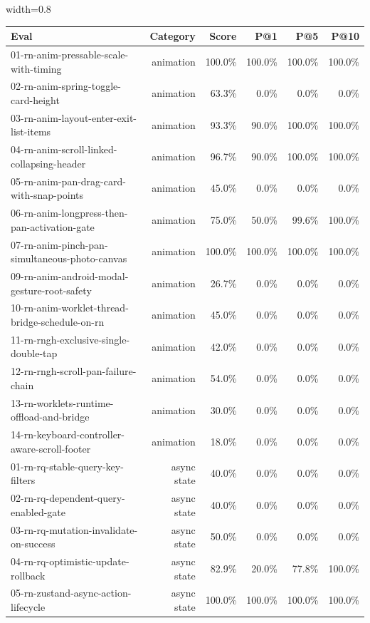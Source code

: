 \begin{table}[htbp]
\centering
\begin{adjustbox}{width=0.8\textwidth}
\begin{tabular}{lrrrrr}
\toprule
Eval & Category & Score & P@1 & P@5 & P@10 \\
\midrule
01-rn-anim-pressable-scale-with-timing & animation & 100.0\% & 100.0\% & 100.0\% & 100.0\% \\
02-rn-anim-spring-toggle-card-height & animation & 63.3\% & 0.0\% & 0.0\% & 0.0\% \\
03-rn-anim-layout-enter-exit-list-items & animation & 93.3\% & 90.0\% & 100.0\% & 100.0\% \\
04-rn-anim-scroll-linked-collapsing-header & animation & 96.7\% & 90.0\% & 100.0\% & 100.0\% \\
05-rn-anim-pan-drag-card-with-snap-points & animation & 45.0\% & 0.0\% & 0.0\% & 0.0\% \\
06-rn-anim-longpress-then-pan-activation-gate & animation & 75.0\% & 50.0\% & 99.6\% & 100.0\% \\
07-rn-anim-pinch-pan-simultaneous-photo-canvas & animation & 100.0\% & 100.0\% & 100.0\% & 100.0\% \\
09-rn-anim-android-modal-gesture-root-safety & animation & 26.7\% & 0.0\% & 0.0\% & 0.0\% \\
10-rn-anim-worklet-thread-bridge-schedule-on-rn & animation & 45.0\% & 0.0\% & 0.0\% & 0.0\% \\
11-rn-rngh-exclusive-single-double-tap & animation & 42.0\% & 0.0\% & 0.0\% & 0.0\% \\
12-rn-rngh-scroll-pan-failure-chain & animation & 54.0\% & 0.0\% & 0.0\% & 0.0\% \\
13-rn-worklets-runtime-offload-and-bridge & animation & 30.0\% & 0.0\% & 0.0\% & 0.0\% \\
14-rn-keyboard-controller-aware-scroll-footer & animation & 18.0\% & 0.0\% & 0.0\% & 0.0\% \\
01-rn-rq-stable-query-key-filters & async state & 40.0\% & 0.0\% & 0.0\% & 0.0\% \\
02-rn-rq-dependent-query-enabled-gate & async state & 40.0\% & 0.0\% & 0.0\% & 0.0\% \\
03-rn-rq-mutation-invalidate-on-success & async state & 50.0\% & 0.0\% & 0.0\% & 0.0\% \\
04-rn-rq-optimistic-update-rollback & async state & 82.9\% & 20.0\% & 77.8\% & 100.0\% \\
05-rn-zustand-async-action-lifecycle & async state & 100.0\% & 100.0\% & 100.0\% & 100.0\% \\

\end{tabular}
\end{adjustbox}
\end{table}
